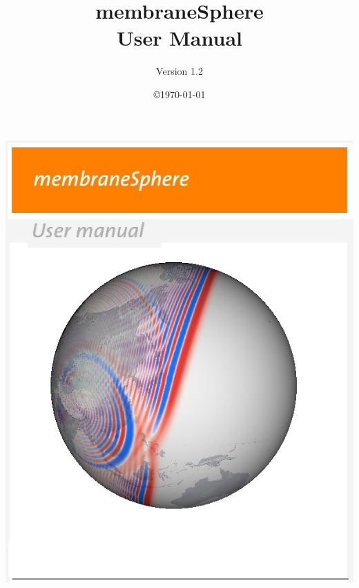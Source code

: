 \documentclass[a4paper,
                          headsepline,
                          listof=totoc,
                          toc=listof,
                          headings=small]{scrreprt} %
\begin{document}

\thispagestyle{empty}

\noindent
\includegraphics[width=1.0\textwidth]{figures/title_plain5.jpg}

\newpage
\thispagestyle{empty}

\begin{samepage}

\noindent
\vspace{12cm}\\

%
\title{membraneSphere\\User Manual}

\author{Version 1.2}

\date{{\small  \copyright   \today }}

\maketitle


\end{samepage}
\end{document}
